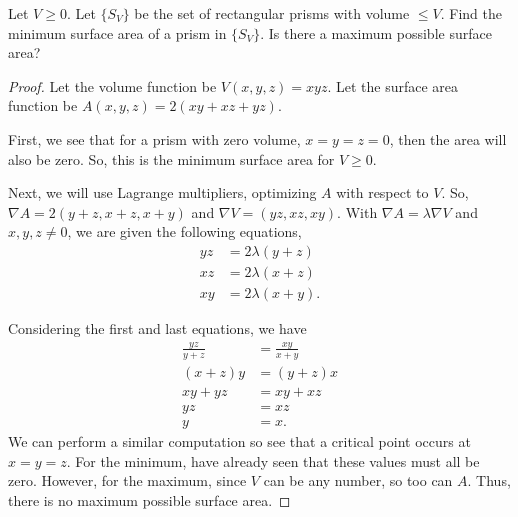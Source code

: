 \documentclass[../hw5]{subfiles}
\begin{document}
\begin{problem}[2]
Let $V\ge 0$.
Let $\{S_V\}$ be the set of rectangular prisms with volume $\le V$.
Find the minimum surface area of a prism in $\{S_V\}$.
Is there a maximum possible surface area?
\end{problem}
\begin{proof}
	Let the volume function be $V(x,y,z)=xyz$.
	Let the surface area function be  $A(x,y,z)=2(xy+xz+yz)$.

	First, we see that for a prism with zero volume,  $x=y=z=0$, then the area will also be zero.
	So, this is the minimum surface area for  $V\ge 0$.

	Next, we will use Lagrange multipliers, optimizing $A$ with respect to  $V$.
	So, $\nabla A = 2(y+z,x+z,x+y)$ and $\nabla V = (yz,xz,xy)$. With $\nabla A = \lambda\nabla V$ and $x,y,z\neq 0$, we are given the following equations,
	\begin{align*}
		yz & =2\lambda(y+z)  \\
		xz & = 2\lambda(x+z) \\
		xy & = 2\lambda(x+y)
		.\end{align*}

	Considering the first and last equations, we have
	\begin{align*}
		\frac{yz}{y + z} & = \frac{xy}{x + y} \\
		(x + z)y         & = (y + z)x         \\
		xy + yz          & = xy + xz          \\
		yz               & = xz               \\
		y                & = x
		.\end{align*} We can perform a similar computation so see that a critical point occurs at $x=y=z$.
	For the minimum, have already seen that these values must all be zero.
	However, for the maximum, since $V$ can be any number, so too can $A$. Thus, there is no maximum possible surface area.
\end{proof}
\end{document}
